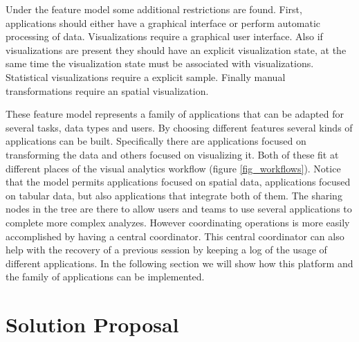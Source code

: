 Under the feature model some additional restrictions are found. First, applications should either have a graphical interface or perform automatic processing of data. Visualizations require a graphical user interface. Also if visualizations are present they should have an explicit visualization state, at the same time the visualization state must be associated with visualizations. Statistical visualizations require a explicit sample. Finally manual transformations require an spatial visualization. 

These feature model represents a family of applications that can be adapted for several tasks, data types and users. By choosing different features several kinds of applications can be built. Specifically there are applications focused on transforming the data and others focused on visualizing it. Both of these fit at different places of the visual analytics workflow (figure \ref{fig_workflows}). Notice that the model permits applications focused on spatial data, applications focused on tabular data, but also applications that integrate both of them. The sharing nodes in the tree are there to allow users and teams to use several applications to complete more complex analyzes. However coordinating operations is more easily accomplished by having a central coordinator. This central coordinator can also help with the recovery of a previous session by keeping a log of the usage of different applications. In the following section we will show how this platform and the family of applications can be implemented.







\section{Solution Proposal}

